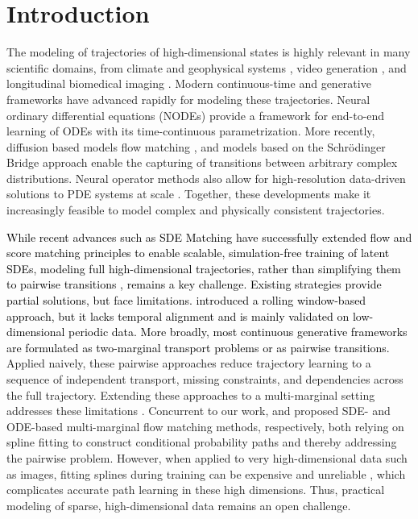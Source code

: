 \documentclass[twoside]{article}
\begin{document}
\section{Introduction}

The modeling of trajectories of high-dimensional states is highly relevant in many scientific domains, from climate and geophysical systems \citep{kidger2020neural}, video generation \citep{voleti2021simple, bossa2023multidimensional, dang2023conditional}, and longitudinal biomedical imaging \citep{lachinov2023learning}. Modern continuous-time and generative frameworks have advanced rapidly for modeling these trajectories. Neural ordinary differential equations (NODEs) \citep{chen2018neural} provide a framework for end-to-end learning of ODEs with its time-continuous parametrization. More recently, diffusion based models \citep{shi2023diffusion,liu20232} flow matching \citep{tong2023simulation}, and models based on the Schr{\"o}dinger Bridge approach \citep{hamdouche2023generative} enable the capturing of transitions between arbitrary complex distributions. Neural operator methods also allow for high-resolution data-driven solutions to PDE systems at scale \citep{yang2023fourier}. Together, these developments make it increasingly feasible to model complex and physically consistent trajectories. 


\textcolor{black}{While recent advances such as SDE Matching \citep{bartosh2025sde} have successfully extended flow and score matching principles to enable scalable, simulation-free training of latent SDEs, modeling full high-dimensional trajectories, rather than simplifying them to pairwise transitions \citep{liu2025imageflownet}, remains a key challenge. Existing strategies provide partial solutions, but face limitations. \citep{zhang2024trajectory} introduced a rolling window-based approach, but it lacks temporal alignment and is mainly validated on low-dimensional periodic data. More broadly, most continuous generative frameworks are formulated as two-marginal transport problems or as pairwise transitions.} Applied naively, these pairwise approaches reduce trajectory learning to a sequence of independent transport, missing constraints, and dependencies across the full trajectory.
Extending these approaches to a multi-marginal setting addresses these limitations \citep{pass2015multi}. 
Concurrent to our work, \citep{lee2025multi} and \citep{rohbeckmodeling} proposed SDE- and ODE-based multi-marginal flow matching methods, respectively, both relying on spline fitting to construct conditional probability paths and thereby addressing the pairwise problem. However, when applied to very high-dimensional data such as images, fitting splines during training can be expensive and unreliable \citep{hastie2009esl, wahba1990spline}, which complicates accurate path learning in these high dimensions.
Thus, practical modeling of sparse, high-dimensional data remains an open challenge.
\end{document}
